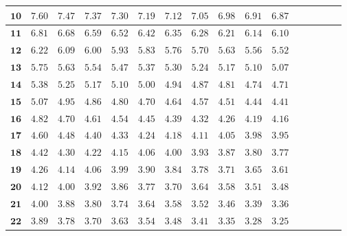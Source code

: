 \begin{customTableWrapper}{1.4}
\begin{longtable}{|r|r|r|r|r|r|r|r|r|r|r|r|r|r|r|r|}
    ${\mathbf{10}}$  & ${7.60}$    & ${7.47}$    & ${7.37}$    & ${7.30}$    & ${7.19}$    & ${7.12}$    & ${7.05}$    & ${6.98}$    & ${6.91}$    & ${6.87}$   \\ \hline 
    ${\mathbf{11}}$  & ${6.81}$    & ${6.68}$    & ${6.59}$    & ${6.52}$    & ${6.42}$    & ${6.35}$    & ${6.28}$    & ${6.21}$    & ${6.14}$    & ${6.10}$   \\ \hline 
    ${\mathbf{12}}$  & ${6.22}$    & ${6.09}$    & ${6.00}$    & ${5.93}$    & ${5.83}$    & ${5.76}$    & ${5.70}$    & ${5.63}$    & ${5.56}$    & ${5.52}$   \\ \hline 
    ${\mathbf{13}}$  & ${5.75}$    & ${5.63}$    & ${5.54}$    & ${5.47}$    & ${5.37}$    & ${5.30}$    & ${5.24}$    & ${5.17}$    & ${5.10}$    & ${5.07}$   \\ \hline 
    ${\mathbf{14}}$  & ${5.38}$    & ${5.25}$    & ${5.17}$    & ${5.10}$    & ${5.00}$    & ${4.94}$    & ${4.87}$    & ${4.81}$    & ${4.74}$    & ${4.71}$   \\ \hline 
    ${\mathbf{15}}$  & ${5.07}$    & ${4.95}$    & ${4.86}$    & ${4.80}$    & ${4.70}$    & ${4.64}$    & ${4.57}$    & ${4.51}$    & ${4.44}$    & ${4.41}$   \\ \hline 
    ${\mathbf{16}}$  & ${4.82}$    & ${4.70}$    & ${4.61}$    & ${4.54}$    & ${4.45}$    & ${4.39}$    & ${4.32}$    & ${4.26}$    & ${4.19}$    & ${4.16}$   \\ \hline 
    ${\mathbf{17}}$  & ${4.60}$    & ${4.48}$    & ${4.40}$    & ${4.33}$    & ${4.24}$    & ${4.18}$    & ${4.11}$    & ${4.05}$    & ${3.98}$    & ${3.95}$   \\ \hline 
    ${\mathbf{18}}$  & ${4.42}$    & ${4.30}$    & ${4.22}$    & ${4.15}$    & ${4.06}$    & ${4.00}$    & ${3.93}$    & ${3.87}$    & ${3.80}$    & ${3.77}$   \\ \hline 
    ${\mathbf{19}}$  & ${4.26}$    & ${4.14}$    & ${4.06}$    & ${3.99}$    & ${3.90}$    & ${3.84}$    & ${3.78}$    & ${3.71}$    & ${3.65}$    & ${3.61}$   \\ \hline 
    ${\mathbf{20}}$  & ${4.12}$    & ${4.00}$    & ${3.92}$    & ${3.86}$    & ${3.77}$    & ${3.70}$    & ${3.64}$    & ${3.58}$    & ${3.51}$    & ${3.48}$   \\ \hline 
    ${\mathbf{21}}$  & ${4.00}$    & ${3.88}$    & ${3.80}$    & ${3.74}$    & ${3.64}$    & ${3.58}$    & ${3.52}$    & ${3.46}$    & ${3.39}$    & ${3.36}$   \\ \hline 
    ${\mathbf{22}}$  & ${3.89}$    & ${3.78}$    & ${3.70}$    & ${3.63}$    & ${3.54}$    & ${3.48}$    & ${3.41}$    & ${3.35}$    & ${3.28}$    & ${3.25}$   \\ \hline 

\end{longtable}
\end{customTableWrapper}

